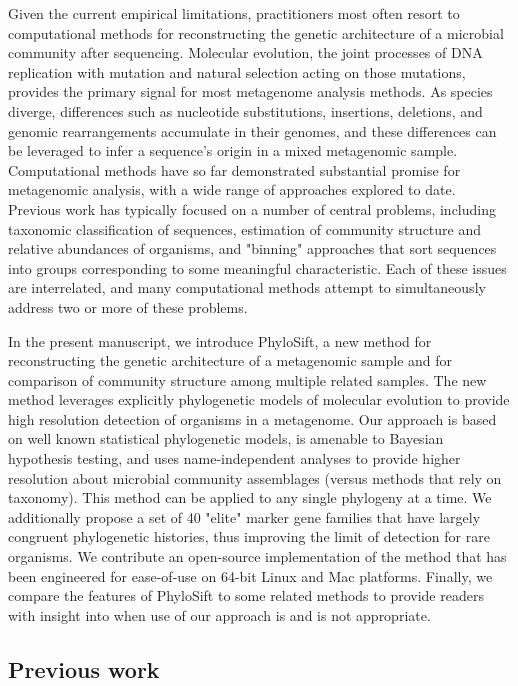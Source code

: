 \documentclass[10pt]{article}
\begin{document}
Given the current empirical limitations, practitioners most often resort to computational methods for reconstructing the genetic architecture of a microbial community after sequencing. 
Molecular evolution, the joint processes of DNA replication with mutation and natural selection acting on those mutations, provides the primary signal for most metagenome analysis methods. 
As species diverge, differences such as nucleotide substitutions, insertions, deletions, and genomic rearrangements accumulate in their genomes, and these differences can be leveraged to infer a sequence's origin in a mixed metagenomic sample.
Computational methods have so far demonstrated substantial promise for metagenomic analysis, with a wide range of approaches explored to date. 
Previous work has typically focused on a number of central problems, including taxonomic classification of sequences, estimation of community structure and relative abundances of organisms, and "binning" approaches that sort sequences into groups corresponding to some meaningful characteristic. 
Each of these issues are interrelated, and many computational methods attempt to simultaneously address two or more of these problems.

In the present manuscript, we introduce PhyloSift, a new method for reconstructing the genetic architecture of a metagenomic sample and for comparison of community structure among multiple related samples.
The new method leverages explicitly phylogenetic models of molecular evolution to provide high resolution detection of organisms in a metagenome. 
Our approach is based on well known statistical phylogenetic models, is amenable to Bayesian hypothesis testing, and uses name-independent analyses to provide higher resolution about microbial community assemblages (versus methods that rely on taxonomy). This method can be applied to any single phylogeny at a time.
We additionally propose a set of 40 "elite" marker gene families that have largely congruent phylogenetic histories, thus improving the limit of detection for rare organisms.
We contribute an open-source implementation of the method that has been engineered for ease-of-use on 64-bit Linux and Mac platforms.
Finally, we compare the features of PhyloSift to some related methods to provide readers with insight into when use of our approach is and is not appropriate.


\subsection*{Previous work}
\end{document}
